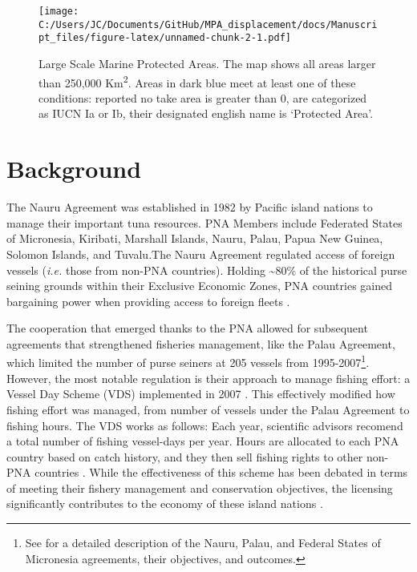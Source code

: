 \documentclass[11pt,]{article}
\let\rmarkdownfootnote\footnote%
\def\footnote{\protect\rmarkdownfootnote}
\begin{document}
\begin{figure}
\centering
\texttt{[image: C:/Users/JC/Documents/GitHub/MPA\_displacement/docs/Manuscript\_files/figure-latex/unnamed-chunk-2-1.pdf]}
\caption{\label{fig:unnamed-chunk-2}\label{fig:LSMPAs_map}Large Scale Marine
Protected Areas. The map shows all areas larger than 250,000
Km\textsuperscript{2}. Areas in dark blue meet at least one of these
conditions: reported no take area is greater than 0, are categorized as
IUCN Ia or Ib, their designated english name is `Protected Area'.}
\end{figure}

\hypertarget{background}{%
\section{Background}\label{background}}

The Nauru Agreement was established in 1982 by Pacific island nations to
manage their important tuna resources. PNA Members include Federated
States of Micronesia, Kiribati, Marshall Islands, Nauru, Palau, Papua
New Guinea, Solomon Islands, and Tuvalu.The Nauru Agreement regulated
access of foreign vessels (\emph{i.e.} those from non-PNA countries).
Holding \textasciitilde{}80\% of the historical purse seining grounds
within their Exclusive Economic Zones, PNA countries gained bargaining
power when providing access to foreign fleets \citep{havice_2010}.

The cooperation that emerged thanks to the PNA allowed for subsequent
agreements that strengthened fisheries management, like the Palau
Agreement, which limited the number of purse seiners at 205 vessels from
1995-2007\footnote{See \citet{havice_2010} for a detailed description of
  the Nauru, Palau, and Federal States of Micronesia agreements, their
  objectives, and outcomes.}. However, the most notable regulation is
their approach to manage fishing effort: a Vessel Day Scheme (VDS)
implemented in 2007 \citep{havice_2013}. This effectively modified how
fishing effort was managed, from number of vessels under the Palau
Agreement to fishing hours. The VDS works as follows: Each year,
scientific advisors recomend a total number of fishing vessel-days per
year. Hours are allocated to each PNA country based on catch history,
and they then sell fishing rights to other non-PNA countries
\citep{aqorau_2018}. While the effectiveness of this scheme has been
debated in terms of meeting their fishery management and conservation
objectives, the licensing significantly contributes to the economy of
these island nations \citep{havice_2010}.
\end{document}
